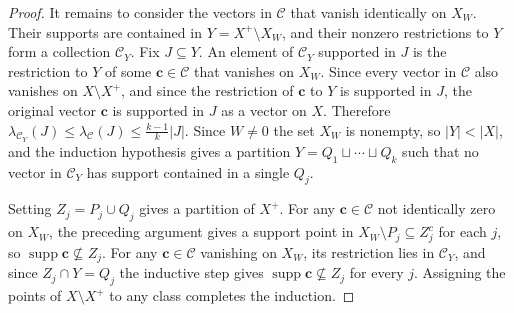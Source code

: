 \documentclass[10pt,a4paper]{amsart}
\begin{document}
\begin{proof}
It remains to consider the vectors in $\mathcal C$ that vanish identically on
$X_W$. Their supports are contained in $Y = X^+ \setminus X_W$, and their
nonzero restrictions to $Y$ form a collection $\mathcal C_Y$. Fix $J \subseteq Y$.
An element of $\mathcal C_Y$ supported in $J$ is the restriction to $Y$ of
some $\mathbf{c}\in\mathcal C$ that vanishes on $X_W$. Since every vector in
$\mathcal C$ also vanishes on $X\setminus X^+$, and since the restriction of
$\mathbf{c}$ to $Y$ is supported in $J$, the original vector $\mathbf{c}$ is
supported in $J$ as a vector on $X$. Therefore
$\lambda_{\mathcal C_Y}(J) \leq \lambda_{\mathcal C}(J) \leq
\frac{k-1}{k}|J|$. Since $W \neq 0$ the set $X_W$ is nonempty, so $|Y| < |X|$,
and the induction hypothesis gives a partition $Y = Q_1 \sqcup \cdots \sqcup Q_k$
such that no vector in $\mathcal C_Y$ has support contained in a single $Q_j$.

Setting $Z_j = P_j \cup Q_j$ gives a partition of $X^+$. For any $\mathbf{c}
\in \mathcal C$ not identically zero on $X_W$, the preceding argument gives a
support point in $X_W \setminus P_j \subseteq Z_j^c$ for each $j$, so
$\operatorname{supp} \mathbf{c} \not\subseteq Z_j$. For any $\mathbf{c} \in
\mathcal C$ vanishing on $X_W$, its restriction lies in $\mathcal C_Y$, and
since $Z_j \cap Y = Q_j$ the inductive step gives $\operatorname{supp}
\mathbf{c} \not\subseteq Z_j$ for every $j$. Assigning the points of $X
\setminus X^+$ to any class completes the induction.
\end{proof}
\end{document}
